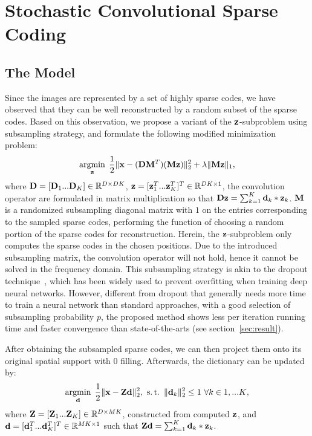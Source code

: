 \section{Stochastic Convolutional Sparse Coding}
\subsection{The Model}
Since the images are represented by a set of highly sparse codes, we have observed that they can be well reconstructed by a random subset of the sparse codes. Based on this observation, we propose a variant of the $\code$-subproblem using subsampling strategy, and formulate the following modified minimization problem:
\begin{equation} \label{eq:updatingCode}
    \minimize{\code} \frac{1}{2}\|\signal - (\Filter \mask^T)(\mask \code) \|_2^2 + \lambda \|\mask \code\|_1,
\end{equation}
where $\Filter = [\Filter_1 ... \Filter_K] \in \mathbb{R}^{D \times DK}$, $\code = [\code_1^T ... \code_K^T]^T \in \mathbb{R}^{DK \times 1}$, the convolution operator are formulated in matrix multiplication so that $ \Filter \code = \sum_{k=1}^{K} \filter_k * \code_k$.  $\mask$ is a randomized subsampling diagonal matrix with $1$ on the entries corresponding to the sampled sparse codes, performing the function of choosing a random portion of the sparse codes for reconstruction. Herein, the $\code$-subproblem only computes the sparse codes in the chosen positions. Due to the introduced subsampling matrix, the convolution operator will not hold, hence it cannot be solved in the frequency domain. This subsampling strategy is akin to the dropout technique~\cite{srivastava2014dropout}, which has been widely used to prevent overfitting when training deep neural networks. However, different from dropout that generally needs more time to train a neural network than standard approaches, with a good selection of subsampling probability $p$, the proposed method shows less per iteration running time and faster convergence than state-of-the-arts (see section~\ref{sec:result}).

After obtaining the subsampled sparse codes, we can then project them onto its original spatial support with $0$ filling. Afterwards, the dictionary can be updated by:
\begin{equation} \label{eq:updatingFilter}
    \minimize{\filter} \frac{1}{2}\|\signal - \Code \filter \|_2^2, ~\subjectto ~ \|\filter_k\|^2_2 \leq 1 ~ \forall k \in {1,...K},
\end{equation}
where $\Code= [\Code_1 ... \Code_K] \in \mathbb{R}^{D \times MK}$, constructed from computed $\code$, and $\filter= [\filter_1^T ... \filter_K^T]^T \in \mathbb{R}^{MK \times 1}$ such that $ \Code \filter = \sum_{k=1}^{K} \filter_k * \code_k$.

